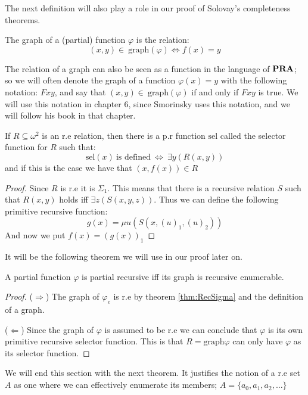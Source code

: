 \documentclass[../main.tex]{subfiles}
\begin{document}
The next definition will also play a role in our proof of Solovay's
completeness theorems.

\begin{defi}
	The graph of a (partial) function $\varphi$ is the relation:
	\[(x,y)\in\ \text{graph} (\varphi)\Leftrightarrow f(x)=y\]
\end{defi}
The relation of a graph can also be seen as a function in the language of
$\text{\textbf{PRA}}$; so we will often denote the graph of a function $\varphi(x)=y$ with the
following notation: $Fxy$, and say that $(x,y)\in\ \text{graph}(\varphi)$ if and
only if $Fxy$ is true. We will use this notation in chapter 6, since Smorinsky
uses this notation, and we will follow his book \parencite{Smor1985} in that
chapter.

\begin{thm}
	If $R\subseteq\omega^2$ is an r.e relation, then there is a p.r
	function $\text{sel}$ called the selector function for $R$ such that:
	$$\text{sel}(x)\ \text{is defined}\ \Leftrightarrow\ \exists y(R(x,y))$$
	and if this is the case we have that $(x,f(x))\in R$
\end{thm}
\begin{proof}
	Since $R$ is r.e it is $\Sigma_1$. This means that there is a recursive
	relation $S$ such that $R(x,y)$ holds iff $\exists z (S(x,y,z))$. Thus
	we can define the following primitive recursive function:
	$$g(x)=\mu u(S(x,(u)_1,(u)_2))$$
	And now we put $f(x)=(g(x))_1$
\end{proof}
It will be the following theorem we will use in our proof later on.
\begin{thm}
	A partial function $\varphi$ is partial recursive iff its graph is recursive
	enumerable.
\end{thm}
\begin{proof}
	($\Rightarrow$) The graph of $\varphi_e$ is r.e by theorem \ref{thm:RecSigma} and the
	definition of a graph.

	($\Leftarrow$) Since the graph of $\varphi$ is assumed to be r.e we can
	conclude that $\varphi$ is its own primitive recursive selector function. This
	is that $R=\text{graph} \varphi$ can only have $\varphi$ as its selector function.
\end{proof}

We will end this section with the next theorem. It justifies the notion of a
r.e set $A$ as one where we can effectively enumerate its members;
$A=\{a_0,a_1,a_2,\ldots\}$
\end{document}
